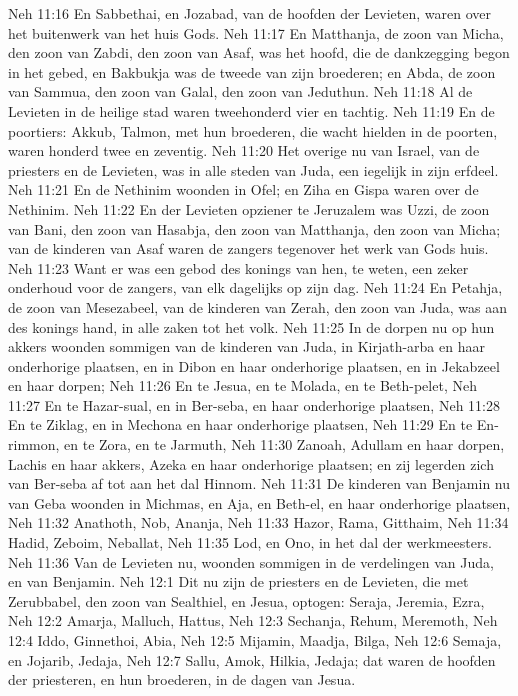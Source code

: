 Neh 11:16  En Sabbethai, en Jozabad, van de hoofden der Levieten, waren over het buitenwerk van het huis Gods.
Neh 11:17  En Matthanja, de zoon van Micha, den zoon van Zabdi, den zoon van Asaf, was het hoofd, die de dankzegging begon in het gebed, en Bakbukja was de tweede van zijn broederen; en Abda, de zoon van Sammua, den zoon van Galal, den zoon van Jeduthun.
Neh 11:18  Al de Levieten in de heilige stad waren tweehonderd vier en tachtig.
Neh 11:19  En de poortiers: Akkub, Talmon, met hun broederen, die wacht hielden in de poorten, waren honderd twee en zeventig.
Neh 11:20  Het overige nu van Israel, van de priesters en de Levieten, was in alle steden van Juda, een iegelijk in zijn erfdeel.
Neh 11:21  En de Nethinim woonden in Ofel; en Ziha en Gispa waren over de Nethinim.
Neh 11:22  En der Levieten opziener te Jeruzalem was Uzzi, de zoon van Bani, den zoon van Hasabja, den zoon van Matthanja, den zoon van Micha; van de kinderen van Asaf waren de zangers tegenover het werk van Gods huis.
Neh 11:23  Want er was een gebod des konings van hen, te weten, een zeker onderhoud voor de zangers, van elk dagelijks op zijn dag.
Neh 11:24  En Petahja, de zoon van Mesezabeel, van de kinderen van Zerah, den zoon van Juda, was aan des konings hand, in alle zaken tot het volk.
Neh 11:25  In de dorpen nu op hun akkers woonden sommigen van de kinderen van Juda, in Kirjath-arba en haar onderhorige plaatsen, en in Dibon en haar onderhorige plaatsen, en in Jekabzeel en haar dorpen;
Neh 11:26  En te Jesua, en te Molada, en te Beth-pelet,
Neh 11:27  En te Hazar-sual, en in Ber-seba, en haar onderhorige plaatsen,
Neh 11:28  En te Ziklag, en in Mechona en haar onderhorige plaatsen,
Neh 11:29  En te En-rimmon, en te Zora, en te Jarmuth,
Neh 11:30  Zanoah, Adullam en haar dorpen, Lachis en haar akkers, Azeka en haar onderhorige plaatsen; en zij legerden zich van Ber-seba af tot aan het dal Hinnom.
Neh 11:31  De kinderen van Benjamin nu van Geba woonden in Michmas, en Aja, en Beth-el, en haar onderhorige plaatsen,
Neh 11:32  Anathoth, Nob, Ananja,
Neh 11:33  Hazor, Rama, Gitthaim,
Neh 11:34  Hadid, Zeboim, Neballat,
Neh 11:35  Lod, en Ono, in het dal der werkmeesters.
Neh 11:36  Van de Levieten nu, woonden sommigen in de verdelingen van Juda, en van Benjamin.
Neh 12:1  Dit nu zijn de priesters en de Levieten, die met Zerubbabel, den zoon van Sealthiel, en Jesua, optogen: Seraja, Jeremia, Ezra,
Neh 12:2  Amarja, Malluch, Hattus,
Neh 12:3  Sechanja, Rehum, Meremoth,
Neh 12:4  Iddo, Ginnethoi, Abia,
Neh 12:5  Mijamin, Maadja, Bilga,
Neh 12:6  Semaja, en Jojarib, Jedaja,
Neh 12:7  Sallu, Amok, Hilkia, Jedaja; dat waren de hoofden der priesteren, en hun broederen, in de dagen van Jesua.
